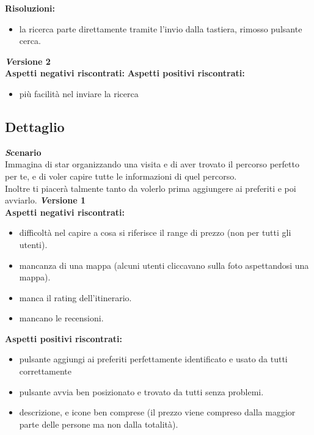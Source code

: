 \textbf{Risoluzioni:}
\begin{itemize}[label=-]

\item la ricerca parte direttamente tramite l’invio dalla tastiera, rimosso pulsante cerca.

\end{itemize}

\textbf{\emph Versione 2}\\
\textbf{Aspetti negativi riscontrati:}
\newline\newline
\textbf{Aspetti positivi riscontrati:}
\begin{itemize}[label=-]

\item più facilità nel inviare la ricerca

\end{itemize}


\subsection{Dettaglio}
\textbf{\emph Scenario}\\
Immagina di star organizzando una visita e di aver trovato il percorso perfetto per te,
e di voler capire tutte le informazioni di quel percorso.\\
Inoltre ti piacerà talmente tanto da volerlo prima aggiungere ai preferiti e poi avviarlo.
\newline
\textbf{\emph Versione 1}\\
\textbf{Aspetti negativi riscontrati:}
\begin{itemize}[label=-]

\item difficoltà nel capire a cosa si riferisce il range di prezzo (non per tutti gli utenti).
\item mancanza di una mappa (alcuni utenti cliccavano sulla foto aspettandosi una mappa).
\item manca il rating dell’itinerario.
\item mancano le recensioni.

\end{itemize}

\textbf{Aspetti positivi riscontrati:}
\begin{itemize}[label=-]

\item pulsante aggiungi ai preferiti perfettamente identificato e usato da tutti correttamente
\item pulsante avvia ben posizionato e trovato da tutti senza problemi.
\item descrizione, e icone ben comprese (il prezzo viene compreso dalla maggior parte delle persone ma non dalla totalità).

\end{itemize}

